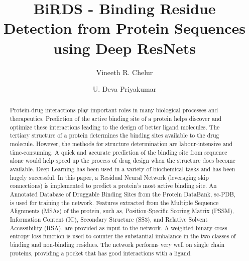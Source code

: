 \documentclass[journal=jacsat,manuscript=article]{achemso}
\author{Vineeth R. Chelur}
\author{U. Deva Priyakumar}
\affiliation[IIIT-H]
{Center for Computational Natural Sciences \& Bioinformatics \\ International Institute of Information Technology \\ Hyderabad - 500032, India}
\title[BiRDS - Binding Residue Detection from Protein Sequences using Deep ResNets]
  {BiRDS - Binding Residue Detection from Protein Sequences using Deep ResNets
  }
\begin{document}






\begin{abstract}
    \noindent Protein-drug interactions play important roles in many biological processes and therapeutics. Prediction of the active binding site of a protein helps discover and optimize these interactions leading to the design of better ligand molecules. The tertiary structure of a protein determines the binding sites available to the drug molecule. However, the methods for structure determination are labour-intensive and time-consuming. A quick and accurate prediction of the binding site from sequence alone would help speed up the process of drug design when the structure does become available. Deep Learning has been used in a variety of biochemical tasks and has been hugely successful. In this paper, a Residual Neural Network (leveraging skip connections) is implemented to predict a protein's most active binding site. An Annotated Database of Druggable Binding Sites from the Protein DataBank, sc-PDB, is used for training the network. Features extracted from the Multiple Sequence Alignments (MSAs) of the protein, such as, Position-Specific Scoring Matrix (PSSM), Information Content (IC), Secondary Structure (SS3), and Relative Solvent Accessibility (RSA), are provided as input to the network. A weighted binary cross entropy loss function is used to counter the substantial imbalance in the two classes of binding and non-binding residues. The network performs very well on single chain proteins, providing a pocket that has good interactions with a ligand.
\end{abstract}
\end{document}
